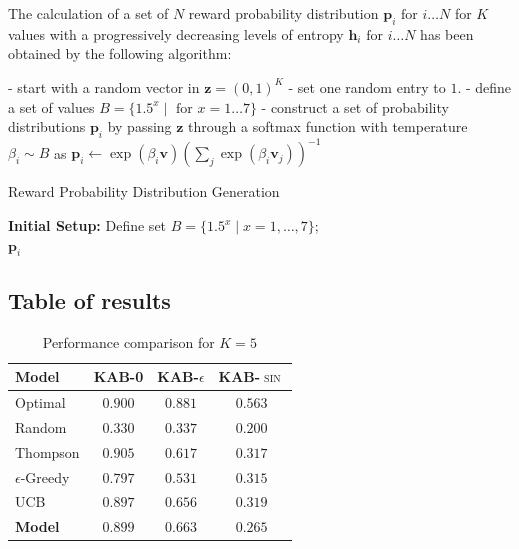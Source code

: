 \noindent The calculation of a set of $N$ reward probability distribution $\mathbf{p}_{i}\text{  for  } i\ldots N$ for $K$ values with a progressively decreasing levels of entropy $\mathbf{h}_{i}\text{  for  } i\ldots N$ has been obtained by the following algorithm:

- start with a random vector in $\mathbf{z}=(0,1)^{K}$
- set one random entry to $1.$
- define a set of values $B=\{1.5^{x}\;\vert\;\text{  for  }x=1\ldots 7\}$
- construct a set of probability distributions $\mathbf{p}_{i}$ by passing $\mathbf{z}$ through a softmax function with temperature $\beta_{i}\sim B$ as $\mathbf{p}_{i}\leftarrow \exp(\beta_{i}\mathbf{v})\left(\sum_{j}\exp(\beta_{i}\mathbf{v}_{j})\right)^{-1}$


\begin{algorithm}[ht]
\caption{Reward Probability Distribution Generation}
\label{alg:reward_distribution}
\SetAlgoLined
{}
\textbf{Initial Setup:}
Define set $B = \{1.5^x \mid x = 1, \ldots, 7\}$; \\
\Return ${\mathbf{p}_i}$
\end{algorithm}


\subsection{Table of results}

\begin{table}[H]
\centering
\caption{Performance comparison for $K=5$}
\label{tab:k5}
\begin{tabular}{l c c c}
\toprule
\textbf{Model} & \textbf{\textsc{KAB-0}} & \textbf{\textsc{KAB-$\epsilon$}} & \textbf{\textsc{KAB-$\sin$}}\\
\midrule
Optimal & $0.900$ & $0.881$ & $0.563$ \\
Random & $0.330$ & $0.337$ & $0.200$ \\
\midrule
Thompson & $0.905$ & $0.617$ & $0.317$ \\
$\epsilon$-Greedy & $0.797$ & $0.531$ & $0.315$ \\
UCB & $0.897$ & $0.656$ & $0.319$ \\
\textbf{Model} & $\mathbf{0.899}$ & $\mathbf{0.663}$ & $\mathbf{0.265}$ \\

\bottomrule
\end{tabular}
\end{table}

